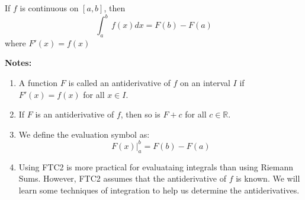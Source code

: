 \documentclass[11pt]{article}
\theoremstyle{plain}
\theoremstyle{remark}
\theoremstyle{plain}
\newcommand{\bd}{\textbf}
\newcommand{\rn}{\mathbb{R}}
\begin{document}
\begin{tcolorbox}[colback=green!5!white,colframe=green!75!black,title=Definition: FTC2]
    If $f$ is continuous on $[a,b]$, then \[\int_a^b\,f(x)dx = F(b) - F(a)\] where $F'(x) = f(x)$
\end{tcolorbox}   

\bd{Notes:}

\begin{enumerate}
    \item A function $F$ is called an antiderivative of $f$ on an interval $I$ if $F'(x)=f(x)$ for all $x\in I$.
    \item If $F$ is an antiderivative of $f$, then so is $F+c$ for all $c\in \rn$.
    \item We define the evaluation symbol as: \[F(x)|_a^b = F(b)-F(a)\]
    \item Using FTC2 is more practical for evaluataing integrals than using Riemann Sums. However, FTC2 assumes that the antiderivative of $f$ is known. We will learn some techniques of integration to help us determine the antiderivatives.
\end{enumerate}
\end{document}
